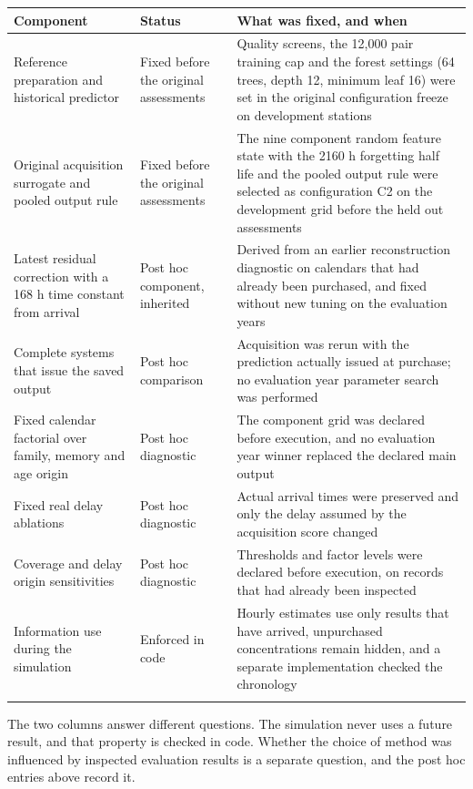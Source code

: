\documentclass[lineno,pdflatex,sn-apa]{sn-jnl}%
\theoremstyle{thmstyleone}%
\theoremstyle{thmstyletwo}%
\theoremstyle{thmstylethree}%
\begin{document}
\begin{center}
\footnotesize
\setlength{\tabcolsep}{2pt}
\begin{tabular}{@{}p{}p{}p{}@{}}
\toprule
Component & Status & What was fixed, and when\\
\midrule
Reference preparation and historical predictor & Fixed before the original assessments & Quality screens, the 12,000 pair training cap and the forest settings (64 trees, depth 12, minimum leaf 16) were set in the original configuration freeze on development stations\\
Original acquisition surrogate and pooled output rule & Fixed before the original assessments & The nine component random feature state with the 2160 h forgetting half life and the pooled output rule were selected as configuration C2 on the development grid before the held out assessments\\
Latest residual correction with a 168 h time constant from arrival & Post hoc component, inherited & Derived from an earlier reconstruction diagnostic on calendars that had already been purchased, and fixed without new tuning on the evaluation years\\
Complete systems that issue the saved output & Post hoc comparison & Acquisition was rerun with the prediction actually issued at purchase; no evaluation year parameter search was performed\\
Fixed calendar factorial over family, memory and age origin & Post hoc diagnostic & The component grid was declared before execution, and no evaluation year winner replaced the declared main output\\
Fixed real delay ablations & Post hoc diagnostic & Actual arrival times were preserved and only the delay assumed by the acquisition score changed\\
Coverage and delay origin sensitivities & Post hoc diagnostic & Thresholds and factor levels were declared before execution, on records that had already been inspected\\
Information use during the simulation & Enforced in code & Hourly estimates use only results that have arrived, unpurchased concentrations remain hidden, and a separate implementation checked the chronology\\
\botrule
\end{tabular}
\end{center}

The two columns answer different questions. The simulation never uses a future result, and that property is checked in code. Whether the choice of method was influenced by inspected evaluation results is a separate question, and the post hoc entries above record it.
\end{document}

